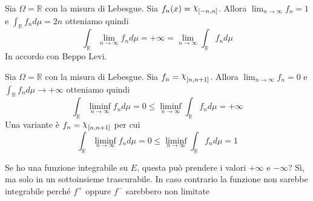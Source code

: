 \begin{example}
    Sia \(\Omega = \mathbb{R}\) con la misura di Lebesgue. Sia \(f_{n}{(x)} =
    \rchi_{[-n, n]}\). Allora \(\lim_{n \to \infty} f_{n} = 1\) e
    \(\int_{\mathbb{R}} f_{n} d\mu = 2n\) otteniamo quindi
    \[
        \int_{\mathbb{R}} \lim_{n \to \infty} f_{n} d\mu = +\infty =
        \lim_{n \to \infty} \int_{\mathbb{R}} f_{n} d\mu
    \]
    In accordo con Beppo Levi. 
\end{example}
\begin{example}\label{ex:limite_integrale_NO}
    Sia \(\Omega = \mathbb{R}\) con la misura di Lebesgue. Sia \(f_{n} =
    \rchi_{[n, n+1]}\). Allora \(\lim_{n \to \infty} f_{n} = 0\) e
    \(\int_{\mathbb{R}} f_{n} d\mu \rightarrow +\infty\) otteniamo quindi 
    \[
        \int_{\mathbb{R}} \liminf_{n \to \infty} f_{n} d\mu = 0 \le \liminf_{n
        \to \infty} \int_{\mathbb{R}} f_{n} d\mu = +\infty
    \]
    Una variante è \(f_{n} = \rchi_{[n, n+1]}\) per cui
    \[
        \int_{\mathbb{R}} \liminf_{n \to \infty} f_{n} d\mu = 0 \le \liminf_{n
        \to \infty} \int_{\mathbb{R}} f_{n} d\mu = 1
    \]
\end{example}

Se ho una funzione integrabile su \(E\), questa può prendere i valori
\(+\infty\) e \(-\infty\)? Sì, ma solo in un sottoinsieme trascurabile. In caso
contrario la funzione non sarebbe integrabile perché \(f^{+}\) oppure \(f^{-}\)
sarebbero non limitate


